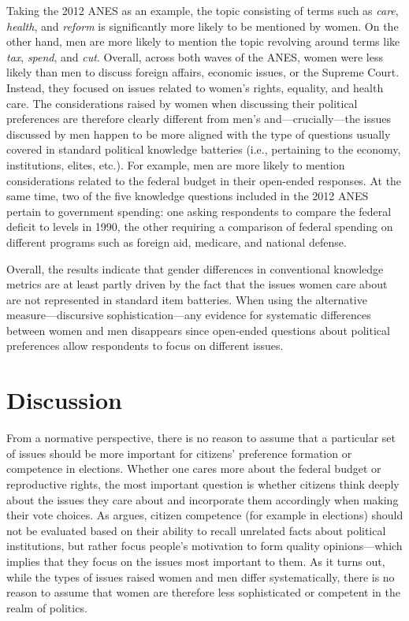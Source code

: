 Taking the 2012 ANES as an example, the topic consisting of terms such as \textit{care}, \textit{health}, and \textit{reform} is significantly more likely to be mentioned by women. On the other hand, men are more likely to mention the topic revolving around terms like \textit{tax}, \textit{spend}, and \textit{cut}. Overall, across both waves of the ANES, women were less likely than men to discuss foreign affairs, economic issues, or the Supreme Court. Instead, they focused on issues related to women's rights, equality, and health care. The considerations raised by women when discussing their political preferences are therefore clearly different from men's and---crucially---the issues discussed by men happen to be more aligned with the type of questions usually covered in standard political knowledge batteries (i.e., pertaining to the economy, institutions, elites, etc.). For example, men are more likely to mention considerations related to the federal budget in their open-ended responses. At the same time, two of the five knowledge questions included in the 2012 ANES pertain to government spending: one asking respondents to compare the federal deficit to levels in 1990, the other requiring a comparison of federal spending on different programs such as foreign aid, medicare, and national defense.

Overall, the results indicate that gender differences in conventional knowledge metrics are at least partly driven by the fact that the issues women care about are not represented in standard item batteries. When using the alternative measure---discursive sophistication---any evidence for systematic differences between women and men disappears since open-ended questions about political preferences allow respondents to focus on different issues. 



\section*{Discussion}

From a normative perspective, there is no reason to assume that a particular set of issues should be more important for citizens' preference formation or competence in elections. Whether one cares more about the federal budget or reproductive rights, the most important question is whether citizens think deeply about the issues they care about and incorporate them accordingly when making their vote choices. As \citet{druckman2014pathologies} argues, citizen competence (for example in elections) should not be evaluated based on their ability to recall unrelated facts about political institutions, but rather focus people's motivation to form quality opinions---which implies that they focus on the issues most important to them. As it turns out, while the types of issues raised women and men differ systematically, there is no reason to assume that women are therefore less sophisticated or competent in the realm of politics.

